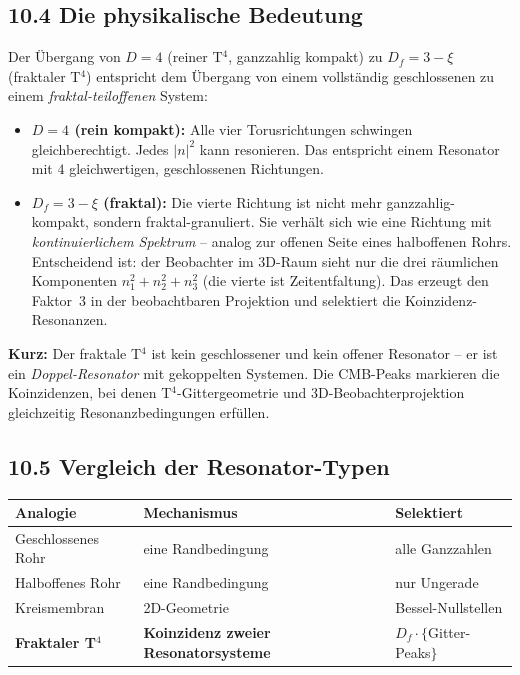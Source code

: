 \subsection*{10.4 Die physikalische Bedeutung}

Der Übergang von $D = 4$ (reiner T$^4$, ganzzahlig kompakt) zu
$D_f = 3 - \xi$ (fraktaler T$^4$) entspricht dem Übergang von einem
vollständig geschlossenen zu einem \emph{fraktal-teiloffenen} System:

\begin{itemize}
  \item \textbf{$D = 4$ (rein kompakt):} Alle vier Torusrichtungen
        schwingen gleichberechtigt. Jedes $|n|^2$ kann resonieren.
        Das entspricht einem Resonator mit $4$ gleichwertigen,
        geschlossenen Richtungen.

  \item \textbf{$D_f = 3 - \xi$ (fraktal):} Die vierte Richtung ist
        nicht mehr ganzzahlig-kompakt, sondern fraktal-granuliert.
        Sie verhält sich wie eine Richtung mit \emph{kontinuierlichem
        Spektrum} -- analog zur offenen Seite eines halboffenen Rohrs.
        Entscheidend ist: der Beobachter im 3D-Raum sieht nur die drei
        räumlichen Komponenten $n_1^2+n_2^2+n_3^2$ (die vierte ist
        Zeitentfaltung). Das erzeugt den Faktor~3 in der
        beobachtbaren Projektion und selektiert die
        Koinzidenz-Resonanzen.
\end{itemize}

\textbf{Kurz:} Der fraktale T$^4$ ist kein geschlossener und kein
offener Resonator -- er ist ein \emph{Doppel-Resonator} mit gekoppelten
Systemen. Die CMB-Peaks markieren die Koinzidenzen, bei denen
T$^4$-Gittergeometrie und 3D-Beobachterprojektion gleichzeitig
Resonanzbedingungen erfüllen.

\subsection*{10.5 Vergleich der Resonator-Typen}

\begin{center}
\begin{tabular}{p{3.5cm}p{3.5cm}p{5cm}}
\toprule
\textbf{Analogie} & \textbf{Mechanismus} & \textbf{Selektiert} \\
\midrule
Geschlossenes Rohr & eine Randbedingung & alle Ganzzahlen \\
Halboffenes Rohr & eine Randbedingung & nur Ungerade \\
Kreismembran & 2D-Geometrie & Bessel-Nullstellen \\
\midrule
\textbf{Fraktaler T$^4$} &
  \textbf{Koinzidenz zweier} \newline \textbf{Resonatorsysteme} &
  $D_f \cdot \{$Gitter-Peaks$\}$ \\
\bottomrule
\end{tabular}
\end{center}

